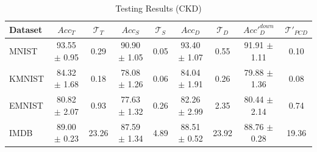 \begin{table}
\caption{Testing Results (CKD)}
\label{tab:test-table-ckd}
\begin{tabular}{lcccccccc}
\toprule
Dataset & $Acc_T$ & $\mathcal{T}_T$ & $Acc_S$ & $\mathcal{T}_S$ & $Acc_D$ & $\mathcal{T}_D$ & $Acc'^{down}_D$ & $\mathcal{T}'_{PCD}$ \\
\midrule
MNIST & 93.55 $\pm$ 0.95 & 0.29 & 90.90 $\pm$ 1.05 & 0.05 & 93.40 $\pm$ 1.07 & 0.55 & 91.91 $\pm$ 1.11 & 0.10 \\
KMNIST & 84.32 $\pm$ 1.68 & 0.18 & 78.08 $\pm$ 1.26 & 0.06 & 84.04 $\pm$ 1.91 & 0.26 & 79.88 $\pm$ 1.36 & 0.08 \\
EMNIST & 80.82 $\pm$ 2.07 & 0.93 & 77.63 $\pm$ 1.32 & 0.26 & 82.26 $\pm$ 2.99 & 2.35 & 80.44 $\pm$ 2.14 & 0.74 \\
IMDB & 89.00 $\pm$ 0.23 & 23.26 & 87.59 $\pm$ 1.34 & 4.89 & 88.51 $\pm$ 0.52 & 23.92 & 88.76 $\pm$ 0.28 & 19.36 \\
\bottomrule
\end{tabular}
\end{table}
